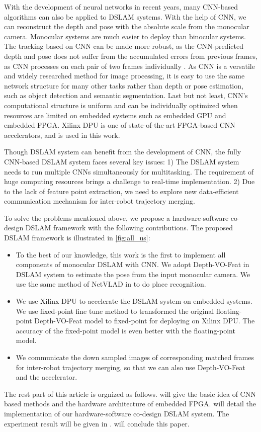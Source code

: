 With the development of neural networks in recent years, many CNN-based algorithms can also be applied to DSLAM systems. With the help of CNN, we can reconstruct the depth and pose with the absolute scale from the monocular camera. Monocular systems are much easier to deploy than binocular systems. 
The tracking based on CNN can be made more robust, as the CNN-predicted depth and pose does not suffer from the accumulated errors from previous frames, as CNN processes on each pair of two frames individually \cite{Tateno:2017776}. As CNN is a versatile and widely researched method for image processing, it is easy to use the same network structure for many other tasks rather than depth or pose estimation, such as object detection \cite{liu2016ssd} and semantic segmentation\cite{long2015fully}.
Last but not least, CNN's computational structure is uniform and can be individually optimized when resources are limited on embedded systems such as embedded GPU\cite{mao2018towards} and embedded FPGA\cite{Yu:2018:IDC:3299999.3283452,Tech:2019360}. Xilinx DPU\cite{Tech:2019360} is one of state-of-the-art FPGA-based CNN accelerators, and is used in this work.

Though DSLAM system can benefit from the development of CNN, the fully CNN-based DSLAM system faces several key issues: 1) The DSLAM system needs to run multiple CNNs simultaneously for multitasking. The requirement of huge computing resources brings a challenge to real-time implementation. 2) Due to the lack of feature point extraction, we need to explore new data-efficient communication mechanism for inter-robot trajectory merging.

To solve the problems mentioned above, we propose a hardware-software co-design DSLAM framework with the following contributions. The proposed DSLAM framework is illustrated in \cref{fig:all_us}:

\begin{itemize}
\item To the best of our knowledge, this work is the first to implement all components of monocular DSLAM with CNN. We adopt Depth-VO-Feat \cite{Zhan:2018e92} in DSLAM system to estimate the pose from the input monocular camera. We use the same method of NetVLAD in \cite{Cieslewski:20187ee} to do place recognition.
\item We use Xilinx DPU to accelerate the DSLAM system on embedded systems. We use fixed-point fine tune method to transformed the original floating-point Depth-VO-Feat model to fixed-point for deploying on Xilinx DPU. The accuracy of the fixed-point model is even better with the floating-point model.
\item We communicate the down sampled images of corresponding matched frames for inter-robot trajectory merging, so that we can also use Depth-VO-Feat and the accelerator.
\end{itemize}
    
   
The rest part of this article is orgnized as follows.  will give the basic idea of CNN based methods and the hardware architecture of embedded FPGA.  will detail the implementation of our hardware-software co-design DSLAM system. The experiment result will be given in .  will conclude this paper.